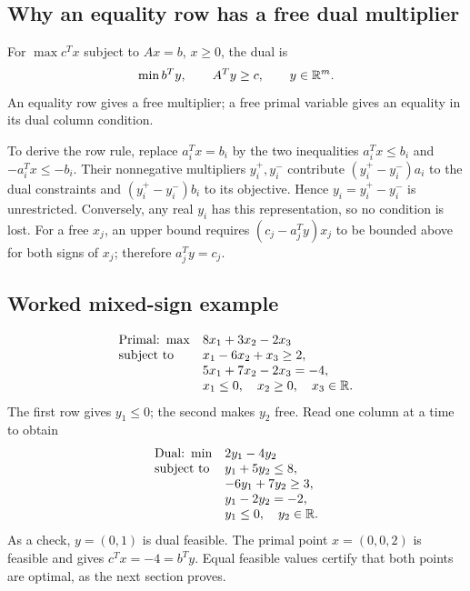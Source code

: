 \documentclass[11pt,a4paper]{article}
\begin{document}
\subsection{Why an equality row has a free dual multiplier}\label{sec:equality-dual}
\begin{lecturecore}
  For $\max c^Tx$ subject to $Ax=b$, $x\geq0$, the dual is
  \[
    \min b^Ty,\qquad A^Ty\geq c,\qquad y\in\mathbb{R}^m.
  \]
  An equality row gives a free multiplier; a free primal variable gives an
  equality in its dual column condition.
\end{lecturecore}
To derive the row rule, replace $a_i^Tx=b_i$ by the two inequalities
$a_i^Tx\leq b_i$ and $-a_i^Tx\leq-b_i$. Their nonnegative multipliers
$y_i^+,y_i^-$ contribute $(y_i^+-y_i^-)a_i$ to the dual constraints and
$(y_i^+-y_i^-)b_i$ to its objective. Hence $y_i=y_i^+-y_i^-$ is unrestricted.
Conversely, any real $y_i$ has this representation, so no condition is lost.
For a free $x_j$, an upper bound requires
$(c_j-a_j^Ty)x_j$ to be bounded above for both signs of $x_j$; therefore
$a_j^Ty=c_j$.

\subsection{Worked mixed-sign example}\label{sec:mixed}
\[
  \begin{array}{ll}
    \text{Primal:}\ \max &8x_1+3x_2-2x_3\\
    \text{subject to}&x_1-6x_2+x_3\geq2,\\
    &5x_1+7x_2-2x_3=-4,\\
    &x_1\leq0,\quad x_2\geq0,\quad x_3\in\mathbb{R}.
  \end{array}
\]
The first row gives $y_1\leq0$; the second makes $y_2$ free. Read one column
at a time to obtain
\[
  \begin{array}{ll}
    \text{Dual:}\ \min &2y_1-4y_2\\
    \text{subject to}&y_1+5y_2\leq8,\\
    &-6y_1+7y_2\geq3,\\
    &y_1-2y_2=-2,\\
    &y_1\leq0,\quad y_2\in\mathbb{R}.
  \end{array}
\]
As a check, $y=(0,1)$ is dual feasible. The primal point $x=(0,0,2)$
is feasible and gives $c^Tx=-4=b^Ty$. Equal feasible values certify that
both points are optimal, as the next section proves.

\end{document}
